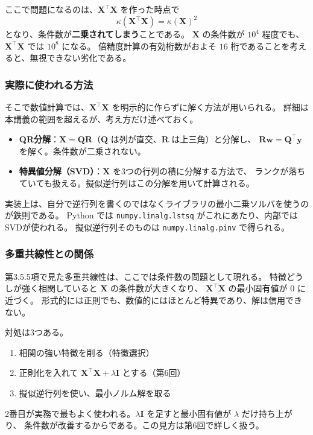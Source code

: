 ここで問題になるのは、$\bm{X}^\top\bm{X}$ を作った時点で
\begin{equation}
  \kappa(\bm{X}^\top\bm{X}) = \kappa(\bm{X})^2
\end{equation}
となり、条件数が\textbf{二乗されてしまう}ことである。
$\bm{X}$ の条件数が $10^4$ 程度でも、$\bm{X}^\top\bm{X}$ では $10^8$ になる。
倍精度計算の有効桁数がおよそ $16$ 桁であることを考えると、無視できない劣化である。

\subsubsection{実際に使われる方法}

そこで数値計算では、$\bm{X}^\top\bm{X}$ を明示的に作らずに解く方法が用いられる。
詳細は本講義の範囲を超えるが、考え方だけ述べておく。

\begin{itemize}
  \item \textbf{QR分解}：$\bm{X} = \bm{Q}\bm{R}$（$\bm{Q}$ は列が直交、$\bm{R}$ は上三角）と分解し、
    $\bm{R}\bm{w} = \bm{Q}^\top\bm{y}$ を解く。条件数が二乗されない。
  \item \textbf{特異値分解（SVD）}：$\bm{X}$ を3つの行列の積に分解する方法で、
    ランクが落ちていても扱える。擬似逆行列はこの分解を用いて計算される。
\end{itemize}

実装上は、自分で逆行列を書くのではなくライブラリの最小二乗ソルバを使うのが鉄則である。
Python では \verb|numpy.linalg.lstsq| がこれにあたり、内部ではSVDが使われる。
擬似逆行列そのものは \verb|numpy.linalg.pinv| で得られる。

\subsubsection{多重共線性との関係}

第3.5.5項で見た多重共線性は、ここでは条件数の問題として現れる。
特徴どうしが強く相関していると $\bm{X}$ の条件数が大きくなり、
$\bm{X}^\top\bm{X}$ の最小固有値が $0$ に近づく。
形式的には正則でも、数値的にはほとんど特異であり、解は信用できない。

対処は3つある。
\begin{enumerate}
  \item 相関の強い特徴を削る（特徴選択）
  \item 正則化を入れて $\bm{X}^\top\bm{X} + \lambda\bm{I}$ とする（第6回）
  \item 擬似逆行列を使い、最小ノルム解を取る
\end{enumerate}
2番目が実務で最もよく使われる。$\lambda\bm{I}$ を足すと最小固有値が $\lambda$ だけ持ち上がり、
条件数が改善するからである。この見方は第6回で詳しく扱う。


